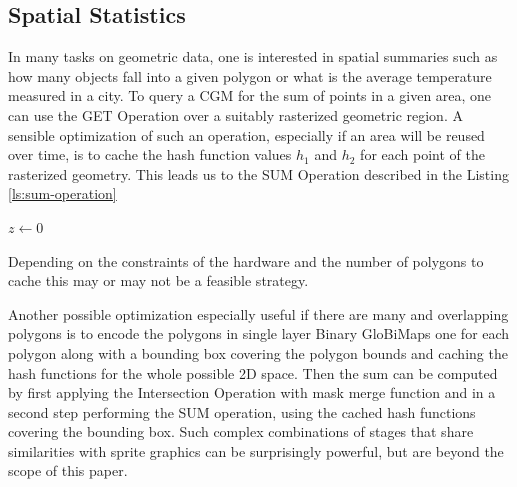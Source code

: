 \documentclass[sigconf, nonacm]{acmart}
\begin{document}



\subsection{Spatial Statistics}\label{spatial-statistics}
In many tasks on geometric data, one is interested in spatial summaries such as how many objects fall into a given polygon or what is the average temperature measured in a city. To query a CGM for the sum of points in a given area, one can use the GET Operation over a suitably rasterized geometric region. A sensible optimization of such an operation, especially if an area will be reused over time, is to cache the hash function values $h_1$ and $h_2$ for each point of the rasterized geometry. This leads us to the SUM Operation described in the Listing \ref{ls:sum-operation}

\begin{algorithm}[h!]
  \SetAlgoLined
  $z \leftarrow 0$

  \caption{SUM Operation}
  \label{ls:sum-operation}
\end{algorithm}

Depending on the constraints of the hardware and the number of polygons to cache this may or may not be a feasible strategy.

Another possible optimization especially useful if there are many and overlapping polygons is to encode the polygons in single layer Binary GloBiMaps one for each polygon along with a bounding box covering the polygon bounds and caching the hash functions for the whole possible 2D space. Then the sum can be computed by first applying the Intersection Operation with mask merge function and in a second step performing the SUM operation, using the cached hash functions covering the bounding box. Such complex combinations of stages that share similarities with sprite graphics can be surprisingly powerful, but are beyond the scope of this paper.
\end{document}
